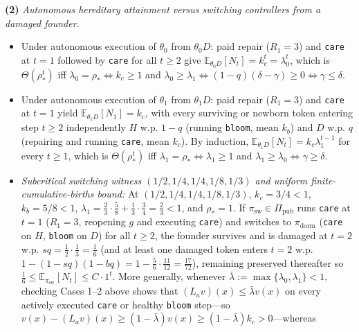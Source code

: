 \documentclass[11pt,a4paper]{article}
\providecommand{\tightlist}{\setlength{\itemsep}{2pt}\setlength{\parskip}{0pt}}
\begin{document}
\textbf{(2)} \emph{Autonomous hereditary attainment versus switching
controllers from a damaged founder.}

\begin{itemize}
\tightlist
\item
  Under autonomous execution of \(\theta_0\) from \(\theta_0 D\): paid
  repair (\(R_1 = 3\)) and \texttt{care} at \(t=1\) followed by
  \texttt{care} for all \(t \ge 2\) give
  \(\mathbb{E}_{\theta_0 D}[N_t] = k_c^t = \lambda_0^t\), which is
  \(\Theta(\rho_*^t)\) iff \(\lambda_0 = \rho_* \iff k_c \ge 1\) and
  \(\lambda_0 \ge \lambda_1 \iff (1-q)(\delta - \gamma) \ge 0 \iff \gamma \le \delta\).
\item
  Under autonomous execution of \(\theta_1\) from \(\theta_1 D\): paid
  repair (\(R_1 = 3\)) and \texttt{care} at \(t=1\) yield
  \(\mathbb{E}_{\theta_1 D}[N_1] = k_c\), with every surviving or
  newborn token entering step \(t \ge 2\) independently \(H\) w.p.
  \(1-q\) (running \texttt{bloom}, mean \(k_b\)) and \(D\) w.p. \(q\)
  (repairing and running \texttt{care}, mean \(k_c\)). By induction,
  \(\mathbb{E}_{\theta_1 D}[N_t] = k_c \lambda_1^{t-1}\) for every
  \(t \ge 1\), which is \(\Theta(\rho_*^t)\) iff
  \(\lambda_1 = \rho_* \iff \lambda_1 \ge 1\) and
  \(\lambda_1 \ge \lambda_0 \iff \gamma \ge \delta\).
\item
  \emph{Subcritical switching witness \((1/2, 1/4, 1/4, 1/8, 1/3)\) and
  uniform finite-cumulative-births bound:} At
  \((1/2, 1/4, 1/4, 1/8, 1/3)\), \(k_c = 3/4 < 1\), \(k_b = 5/8 < 1\),
  \(\lambda_1 = \frac{2}{3}\cdot\frac{5}{8} + \frac{1}{3}\cdot\frac{3}{4} = \frac{2}{3} < 1\),
  and \(\rho_* = 1\). If \(\pi_{\mathrm{sw}} \in \Pi_{\mathrm{pub}}\)
  runs \texttt{care} at \(t=1\) (\(R_1 = 3\), reopening \(g\) and
  executing \texttt{care}) and switches to \(\pi_{\mathrm{dorm}}\)
  (\texttt{care} on \(H\), \texttt{bloom} on \(D\)) for all \(t \ge 2\),
  the founder survives and is damaged at \(t=2\) w.p.
  \(s q = \frac{1}{2}\cdot\frac{1}{3} = \frac{1}{6}\) (and at least one
  damaged token enters \(t=2\) w.p.
  \(1 - (1 - sq)(1 - bq) = 1 - \frac{5}{6}\cdot\frac{11}{12} = \frac{17}{72}\)),
  remaining preserved thereafter so
  \(\frac{1}{6} \le \mathbb{E}_{\pi_{\mathrm{sw}}}[N_t] \le C \cdot 1^t\).
  More generally, whenever
  \(\bar{\lambda} := \max\{\lambda_0, \lambda_1\} < 1\), checking Cases
  1--2 above shows that \((L_a v)(x) \le \bar{\lambda} v(x)\) on every
  actively executed \texttt{care} or healthy \texttt{bloom} step---so
  \(v(x) - (L_a v)(x) \ge (1 - \bar{\lambda}) v(x) \ge (1 - \bar{\lambda}) k_c > 0\)---whereas

\end{itemize}
\end{document}
